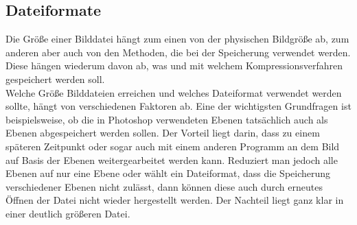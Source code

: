 \documentclass[11pt]{article}
\begin{document}
\subsection{Dateiformate}
\label{sec:org6509309}
Die Größe einer Bilddatei hängt zum einen von der physischen Bildgröße ab, zum anderen aber auch von den Methoden, die bei der Speicherung verwendet werden. Diese hängen wiederum davon ab, was und mit welchem Kompressionsverfahren gespeichert werden soll.\\
Welche Größe Bilddateien erreichen und welches Dateiformat verwendet werden sollte, hängt von verschiedenen Faktoren ab. Eine der wichtigsten Grundfragen ist beispielsweise, ob die in Photoshop verwendeten Ebenen tatsächlich auch als Ebenen abgespeichert werden sollen. Der Vorteil liegt darin, dass zu einem späteren Zeitpunkt oder sogar auch mit einem anderen Programm an dem Bild auf Basis der Ebenen weitergearbeitet werden kann. Reduziert man jedoch alle Ebenen auf nur eine Ebene oder wählt ein Dateiformat, dass die Speicherung verschiedener Ebenen nicht zulässt, dann können diese auch durch erneutes Öffnen der Datei nicht wieder hergestellt werden. Der Nachteil liegt ganz klar in einer deutlich größeren Datei.
\end{document}
